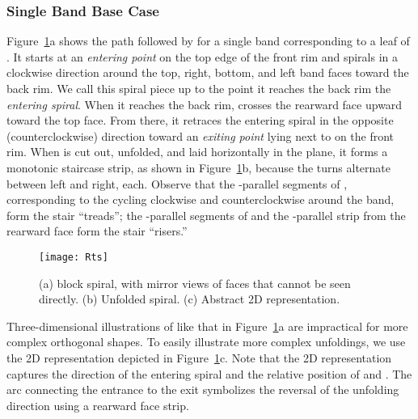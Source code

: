 \documentclass[11pt]{article}
\begin{document}
\subsubsection{Single Band Base Case}
\label{sec:basecase}

Figure~\ref{fig:Rts}a shows the path followed by  for a single band corresponding to a leaf of .
It starts at an \emph{entering point}  on the top edge of
the front rim and spirals in a clockwise direction around the top, right, bottom, and left band faces toward the back rim. We call this spiral piece up to the point it reaches the back rim the
\emph{entering spiral}.
When it reaches the back rim,  crosses the rearward face upward toward the top face.
From there, it retraces the entering spiral in the opposite (counterclockwise)
direction toward an \emph{exiting point}   lying next to  on
the front rim.
When  is cut out, unfolded, and laid horizontally in the plane,
it forms a monotonic staircase strip, as shown in
Figure~\ref{fig:Rts}b, because the turns alternate between left and
right,  each.
Observe that
the -parallel segments of , corresponding to the cycling
clockwise and counterclockwise around the band, form the stair ``treads'';
the -parallel segments of  and the -parallel strip from the rearward face
form the stair ``risers.''


\begin{figure}[htbp]
\centering
\texttt{[image: Rts]}
\caption{(a)  block spiral, with
mirror views of faces that cannot be seen directly.
(b) Unfolded spiral.
(c) Abstract 2D representation.}
\label{fig:Rts}
\end{figure}


Three-dimensional illustrations of  like that in Figure~\ref{fig:Rts}a
are impractical for
more complex orthogonal shapes. To easily illustrate more complex unfoldings, we
use the 2D representation
depicted in Figure~\ref{fig:Rts}c.
Note that the 2D representation captures the direction of the entering spiral and
the relative position of  and . The arc connecting the entrance to the exit
symbolizes the reversal of the unfolding direction
using a rearward face strip.
\end{document}
